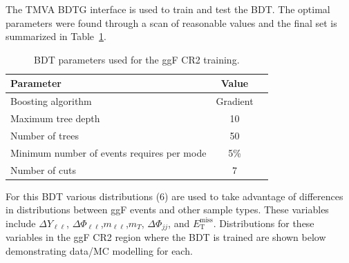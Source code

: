The TMVA BDTG interface is used to train and test the BDT. The optimal parameters were found through a scan of reasonable values and the final set is summarized in Table~\ref{tab:ggFCR2BDTparameters}.
\begin{table}[h!]
\centering
\begin{tabular}{|l|c|c|}
\hline
Parameter                                    & Value     \\
\hline
Boosting algorithm                           & Gradient \\
Maximum tree depth                           &  10      \\
Number of trees                              &  50    \\
Minimum number of events requires per mode   &  5\%     \\ 
Number of cuts                               &  7       \\
\hline
\end{tabular}
\caption{BDT parameters used for the ggF CR2 training.}
\label{tab:ggFCR2BDTparameters}
\end{table}
For this BDT various distributions (6) are used to take advantage of differences in distributions between ggF events and other sample types. These variables include $\Delta Y_{\ell\ell}$, $\Delta \Phi_{\ell\ell}$,$m_{\ell\ell}$,$m_T$, $\Delta \Phi_{jj}$, and $\ensuremath{E_{\text{T}}^{\text{miss}}}$. Distributions for these variables in the ggF CR2 region where the BDT is trained are shown below demonstrating data/MC modelling for each.
